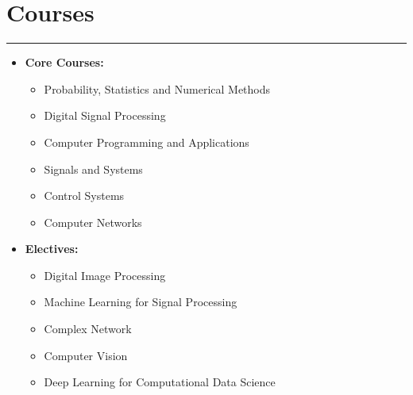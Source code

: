 \documentclass[11pt]{article}
\newlength{\sectionvspace}
\begin{document}
\section*{\bf Courses}
\vspace{\sectionvspace}
\rule{\textwidth}{0.4pt}
\begin{itemize}[leftmargin=*,noitemsep,topsep=0pt]
	\item \textbf{Core Courses:} 
	\begin{itemize}[leftmargin=1em,noitemsep,topsep=0pt]
		\item Probability, Statistics and Numerical Methods
		\item Digital Signal Processing
		\item Computer Programming and Applications
		\item Signals and Systems
		\item Control Systems
		\item Computer Networks
	\end{itemize}
	\item \textbf{Electives:} 
	\begin{itemize}[leftmargin=1em,noitemsep,topsep=0pt]
		\item Digital Image Processing 	
		\item Machine Learning for Signal Processing
		\item Complex Network
		\item Computer Vision
		\item Deep Learning for Computational Data Science
	\end{itemize}
\end{itemize}
	
\end{document}
